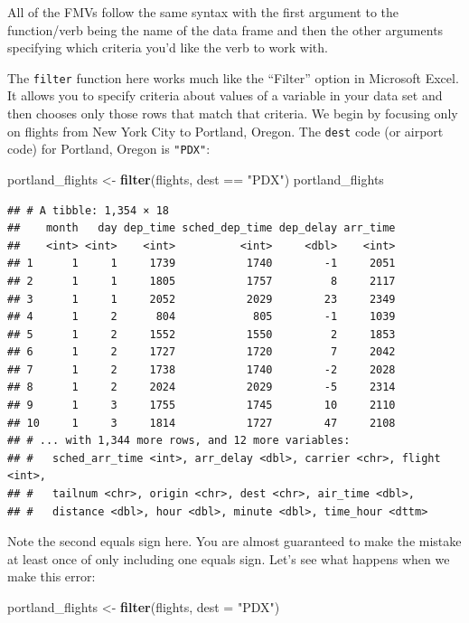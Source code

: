 \documentclass[]{tufte-book}
\newenvironment{Shaded}{\begin{snugshade}}{\end{snugshade}}
\newcommand{\KeywordTok}[1]{\textcolor[rgb]{0.13,0.29,0.53}{\textbf{{#1}}}}
\newcommand{\DataTypeTok}[1]{\textcolor[rgb]{0.13,0.29,0.53}{{#1}}}
\newcommand{\StringTok}[1]{\textcolor[rgb]{0.31,0.60,0.02}{{#1}}}
\newcommand{\NormalTok}[1]{{#1}}
\begin{document}
All of the FMVs follow the same syntax with the first argument to the
function/verb being the name of the data frame and then the other
arguments specifying which criteria you'd like the verb to work with.

The \texttt{filter} function here works much like the ``Filter'' option
in Microsoft Excel. It allows you to specify criteria about values of a
variable in your data set and then chooses only those rows that match
that criteria. We begin by focusing only on flights from New York City
to Portland, Oregon. The \texttt{dest} code (or airport code) for
Portland, Oregon is \texttt{"PDX"}:

\begin{Shaded}
\begin{Highlighting}[]
\NormalTok{portland_flights <-}\StringTok{ }\KeywordTok{filter}\NormalTok{(flights, dest ==}\StringTok{ "PDX"}\NormalTok{)}
\NormalTok{portland_flights}
\end{Highlighting}
\end{Shaded}

\begin{verbatim}
## # A tibble: 1,354 × 18
##    month   day dep_time sched_dep_time dep_delay arr_time
##    <int> <int>    <int>          <int>     <dbl>    <int>
## 1      1     1     1739           1740        -1     2051
## 2      1     1     1805           1757         8     2117
## 3      1     1     2052           2029        23     2349
## 4      1     2      804            805        -1     1039
## 5      1     2     1552           1550         2     1853
## 6      1     2     1727           1720         7     2042
## 7      1     2     1738           1740        -2     2028
## 8      1     2     2024           2029        -5     2314
## 9      1     3     1755           1745        10     2110
## 10     1     3     1814           1727        47     2108
## # ... with 1,344 more rows, and 12 more variables:
## #   sched_arr_time <int>, arr_delay <dbl>, carrier <chr>, flight <int>,
## #   tailnum <chr>, origin <chr>, dest <chr>, air_time <dbl>,
## #   distance <dbl>, hour <dbl>, minute <dbl>, time_hour <dttm>
\end{verbatim}

Note the second equals sign here. You are almost guaranteed to make the
mistake at least once of only including one equals sign. Let's see what
happens when we make this error:

\begin{Shaded}
\begin{Highlighting}[]
\NormalTok{portland_flights <-}\StringTok{ }\KeywordTok{filter}\NormalTok{(flights, }\DataTypeTok{dest =} \StringTok{"PDX"}\NormalTok{)}
\end{Highlighting}
\end{Shaded}
\end{document}
